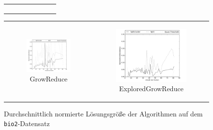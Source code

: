 \documentclass[12pt,a4paper,onecolumn,oneside,titlepage]{article}
\newcommand{\vars}{\texttt}
\begin{document}
\begin{figure}
\begin{tabular}[c]{cc}
\begin{subfigure}[b]{0.5\textwidth}
    \end{subfigure}
  \end{tabular}
  \begin{tabular}[c]{cc}
    \begin{subfigure}[b]{0.5\textwidth}
       \includegraphics[scale=0.35]{plots/quality_grow_reduce.png}
        \caption{GrowReduce}
       \label{fig:qual_grow}
      
    \end{subfigure}&
    \begin{subfigure}[b]{0.5\textwidth}
        \includegraphics[scale=0.35]{plots/quality_explored_grow.png}
         \caption{ExploredGrowReduce}
         \label{fig:qual_explored}
      
    \end{subfigure}
  \end{tabular}
    \caption{Durchschnittlich normierte Lösungsgröße der Algorithmen auf dem \vars{bio2}-Datensatz}

  \label{fig:qual}
\end{figure}
\end{document}
